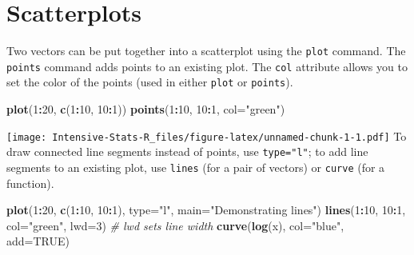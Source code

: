 \documentclass[]{book}
\newenvironment{Shaded}{\begin{snugshade}}{\end{snugshade}}
\newcommand{\CommentTok}[1]{\textcolor[rgb]{0.56,0.35,0.01}{\textit{#1}}}
\newcommand{\DataTypeTok}[1]{\textcolor[rgb]{0.13,0.29,0.53}{#1}}
\newcommand{\DecValTok}[1]{\textcolor[rgb]{0.00,0.00,0.81}{#1}}
\newcommand{\KeywordTok}[1]{\textcolor[rgb]{0.13,0.29,0.53}{\textbf{#1}}}
\newcommand{\NormalTok}[1]{#1}
\newcommand{\OperatorTok}[1]{\textcolor[rgb]{0.81,0.36,0.00}{\textbf{#1}}}
\newcommand{\OtherTok}[1]{\textcolor[rgb]{0.56,0.35,0.01}{#1}}
\newcommand{\StringTok}[1]{\textcolor[rgb]{0.31,0.60,0.02}{#1}}
\theoremstyle{definition}
\theoremstyle{definition}
\theoremstyle{definition}
\theoremstyle{remark}
\begin{document}
\hypertarget{scatterplots}{%
\section{Scatterplots}\label{scatterplots}}

Two vectors can be put together into a scatterplot using the
\texttt{plot} command. The \texttt{points} command adds points to an
existing plot. The \texttt{col} attribute allows you to set the color of
the points (used in either \texttt{plot} or \texttt{points}).

\begin{Shaded}
\begin{Highlighting}[]
\KeywordTok{plot}\NormalTok{(}\DecValTok{1}\OperatorTok{:}\DecValTok{20}\NormalTok{, }\KeywordTok{c}\NormalTok{(}\DecValTok{1}\OperatorTok{:}\DecValTok{10}\NormalTok{, }\DecValTok{10}\OperatorTok{:}\DecValTok{1}\NormalTok{))}
\KeywordTok{points}\NormalTok{(}\DecValTok{1}\OperatorTok{:}\DecValTok{10}\NormalTok{, }\DecValTok{10}\OperatorTok{:}\DecValTok{1}\NormalTok{, }\DataTypeTok{col=}\StringTok{"green"}\NormalTok{)}
\end{Highlighting}
\end{Shaded}

\texttt{[image: Intensive-Stats-R\_files/figure-latex/unnamed-chunk-1-1.pdf]}
To draw connected line segments instead of points, use
\texttt{type="l"}; to add line segments to an existing plot, use
\texttt{lines} (for a pair of vectors) or \texttt{curve} (for a
function).

\begin{Shaded}
\begin{Highlighting}[]
\KeywordTok{plot}\NormalTok{(}\DecValTok{1}\OperatorTok{:}\DecValTok{20}\NormalTok{, }\KeywordTok{c}\NormalTok{(}\DecValTok{1}\OperatorTok{:}\DecValTok{10}\NormalTok{, }\DecValTok{10}\OperatorTok{:}\DecValTok{1}\NormalTok{), }\DataTypeTok{type=}\StringTok{"l"}\NormalTok{,}
     \DataTypeTok{main=}\StringTok{"Demonstrating lines"}\NormalTok{)}
\KeywordTok{lines}\NormalTok{(}\DecValTok{1}\OperatorTok{:}\DecValTok{10}\NormalTok{, }\DecValTok{10}\OperatorTok{:}\DecValTok{1}\NormalTok{, }\DataTypeTok{col=}\StringTok{"green"}\NormalTok{, }\DataTypeTok{lwd=}\DecValTok{3}\NormalTok{) }\CommentTok{# lwd sets line width}
\KeywordTok{curve}\NormalTok{(}\KeywordTok{log}\NormalTok{(x), }\DataTypeTok{col=}\StringTok{"blue"}\NormalTok{, }\DataTypeTok{add=}\OtherTok{TRUE}\NormalTok{)}
\end{Highlighting}
\end{Shaded}
\end{document}
